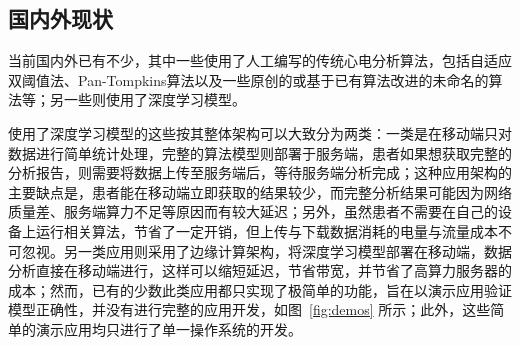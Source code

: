 \subsection{国内外\app 现状}\label{subsec:app-status}

当前国内外已有不少\app ，其中一些使用了人工编写的传统心电分析算法\cite{zhengJiyukechuandaishebeideyidongjianhuAPP2019,wuYidongxindianjiancexitongdeyanjiuyushixian2018,chenYidongxindianxinxijianhuxitongjixindianjiancesuanfadeyanjiu2018,heJiyuyidongpingtaidexindianjianceyiliaoxitongdeshixian2017,gradlRealtimeECGMonitoring2012,wenRealtimeECGTelemonitoring2008}，包括自适应双阈值法\cite{chenYidongxindianxinxijianhuxitongjixindianjiancesuanfadeyanjiu2018}、Pan-Tompkins算法\cite{gradlRealtimeECGMonitoring2012}以及一些原创的或基于已有算法改进的未命名的算法等；另一些\app 则使用了深度学习模型\cite{wangJiyushenduxuexideyidongyuanchengxindianjiancexitongshejiyushixian2020,singhSmartECGMonitoring2022,chenJiyushenduxuexidexindianfenximoxingdeshejiyuyouhua2021,liuJiyuyidongzhongduanfenxidekechuandairouxingxindianjiancexitong2021,wangEnablingSmartPersonalized2014,jinPredictingCardiovascularDisease2009}。

使用了深度学习模型的这些\app 按其整体架构可以大致分为两类：一类是在移动端只对数据进行简单统计处理，完整的算法模型则部署于服务端\cite{wangJiyushenduxuexideyidongyuanchengxindianjiancexitongshejiyushixian2020,singhSmartECGMonitoring2022}，患者如果想获取完整的分析报告，则需要将数据上传至服务端后，等待服务端分析完成；这种应用架构的主要缺点是，患者能在移动端立即获取的结果较少，而完整分析结果可能因为网络质量差、服务端算力不足等原因而有较大延迟；另外，虽然患者不需要在自己的设备上运行相关算法，节省了一定开销，但上传与下载数据消耗的电量与流量成本不可忽视。另一类应用则采用了边缘计算架构，将深度学习模型部署在移动端，数据分析直接在移动端进行\cite{chenJiyushenduxuexidexindianfenximoxingdeshejiyuyouhua2021,liuJiyuyidongzhongduanfenxidekechuandairouxingxindianjiancexitong2021,wangEnablingSmartPersonalized2014,jinPredictingCardiovascularDisease2009}，这样可以缩短延迟，节省带宽，并节省了高算力服务器的成本；然而，已有的少数此类应用都只实现了极简单的功能，旨在以演示应用验证模型正确性，并没有进行完整的应用开发，如图~\ref{fig:demos} 所示；此外，这些简单的演示应用均只进行了单一操作系统的开发。

